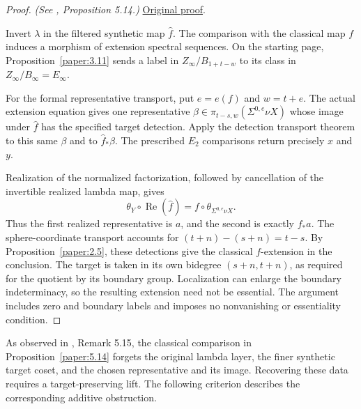 \begin{proof}
\textit{(See \cite{LWX126}, Proposition 5.14.)} \href{paper/main.tex.html#L1589}{Original proof}.

Invert $\lambda$ in the filtered synthetic map $\widehat f$. The comparison with the classical map $f$ induces a morphism of extension spectral sequences. On the starting page, Proposition~\ref{paper:3.11} sends a label in $Z_\infty/B_{1+t-w}$ to its class in $Z_\infty/B_\infty=E_\infty$.

For the formal representative transport, put $e=e(f)$ and $w=t+e$.
The actual extension equation gives one representative
$\beta\in\pi_{t-s,w}(\Sigma^{0,e}\nu X)$ whose image under $\hat f$
has the specified target detection. Apply the detection transport theorem
to this same $\beta$ and to $\hat f_*\beta$. The prescribed $E_2$
comparisons return precisely $x$ and $y$.

Realization of the normalized factorization, followed by cancellation of
the invertible realized lambda map, gives
\[
\theta_Y\circ\operatorname{Re}(\hat f)
 =f\circ\theta_{\Sigma^{0,e}\nu X}.
\]
Thus the first realized representative is $a$, and the second is exactly
$f_*a$. The sphere-coordinate transport accounts for
$(t+n)-(s+n)=t-s$. By Proposition~\ref{paper:2.5}, these detections give
the classical $f$-extension in the conclusion. The target is taken in its
own bidegree $(s+n,t+n)$, as required for the quotient by its boundary
group. Localization can enlarge the boundary indeterminacy, so the
resulting extension need not be essential. The argument includes zero
and boundary labels and imposes no nonvanishing or essentiality condition.
\end{proof}

As observed in \cite{LWX126}, Remark 5.15, the classical comparison
in Proposition~\ref{paper:5.14} forgets the original lambda layer,
the finer synthetic target coset, and the chosen representative and
its image. Recovering these data requires a target-preserving lift.
The following criterion describes the corresponding additive
obstruction.

